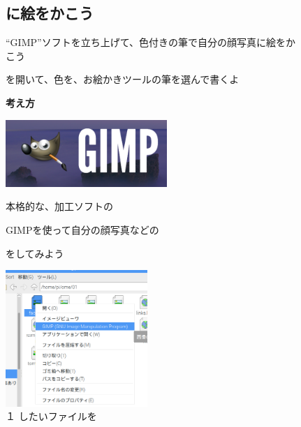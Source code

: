 \documentclass[a4paper,12pt]{jarticle}
\begin{document}
\begin{figure}[ht]
  \subsection{\theExercise {}に絵をかこう}

  \bigskip

  “GIMP”ソフトを立ち上げて、色付きの筆で自分の顔写真に絵をかこう

  を開いて、色を、お絵かきツールの筆を選んで書くよ

  \textbf{考え方}



  \begin{minipage}{\textwidth}
    \centering
    \includegraphics[width=6.112cm]{textbook-img123.png}
    \begin{minipage}[b]{8.617cm}

      本格的な、加工ソフトの

      GIMPを使って自分の顔写真などの

      をしてみよう
    \end{minipage}


  \end{minipage}
  \bigskip




  \begin{minipage}{\textwidth}
    \centering
    \begin{minipage}{5.852cm}
      \includegraphics[width=5.359cm]{textbook-img124.png}\\
      １ したいファイルを


\end{minipage}
\end{minipage}
\end{figure}
\end{document}
